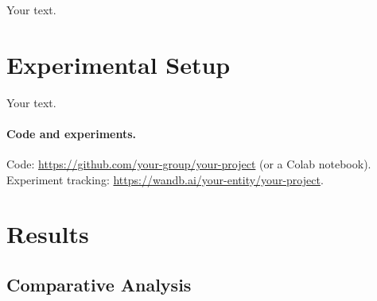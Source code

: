 \documentclass{article}
\begin{document}
Your text.

\section{Experimental Setup}

Your text.

\paragraph{Code and experiments.}
Code: \url{https://github.com/your-group/your-project} (or a Colab notebook). \\
Experiment tracking: \url{https://wandb.ai/your-entity/your-project}.

\section{Results}

\subsection{Comparative Analysis}
\end{document}
